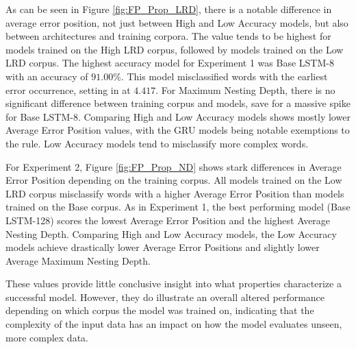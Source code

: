 As can be seen in Figure \ref{fig:FP_Prop_LRD}, there is a notable difference in average error position, not just between High and Low Accuracy models, but also between architectures and training corpora. The value tends to be highest for models trained on the High LRD corpus, followed by models trained on the Low LRD corpus. The highest accuracy model for Experiment 1 was Base LSTM-8 with an accuracy of $91.00\%$. This model misclassified words with the earliest error occurrence, setting in at $4.417$. For Maximum Nesting Depth, there is no significant difference between training corpus and models, save for a massive spike for Base LSTM-8. Comparing High and Low Accuracy models shows mostly lower Average Error Position values, with the GRU models being notable exemptions to the rule. Low Accuracy models tend to misclassify more complex words.

For Experiment 2, Figure \ref{fig:FP_Prop_ND} shows stark differences in Average Error Position depending on the training corpus. All models trained on the Low LRD corpus misclassify words with a higher Average Error Position than models trained on the Base corpus. As in Experiment 1, the best performing model (Base LSTM-128) scores the lowest Average Error Position and the highest Average Nesting Depth. Comparing High and Low Accuracy models, the Low Accuracy models achieve drastically lower Average Error Positions and slightly lower Average Maximum Nesting Depth.

These values provide little conclusive insight into what properties characterize a successful model. However, they do illustrate an overall altered performance depending on which corpus the model was trained on, indicating that the complexity of the input data has an impact on how the model evaluates unseen, more complex data.

